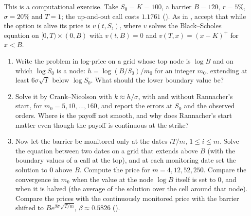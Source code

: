 \begin{exercise}\label{ex:num-barrier}
\medium This is a computational exercise. Take $S_0=K=100$, a barrier $B=120$, $r=5\%$, $\sigma=20\%$ and
$T=1$; the up-and-out call costs $1.1761$ (). As in
, accept that while the option is alive its price is $v(t,S_t)$,
where $v$ solves the Black--Scholes equation on $[0,T)\times(0,B)$ with $v(t,B)=0$ and
$v(T,x)=(x-K)^+$ for $x<B$.
\begin{enumerate}[label=(\alph*)]
  \item Write the problem in log-price on a grid whose top node is $\log B$ and on which $\log S_0$ is a
    node: $h=\log(B/S_0)/m_0$ for an integer $m_0$, extending at least $6\sigma\sqrt T$ below $\log S_0$.
    What should the lower boundary value be?
  \item Solve it by Crank--Nicolson with $k\approx h/\sigma$, with and without Rannacher's start, for
    $m_0=5,10,\dots,160$, and report the errors at $S_0$ and the observed orders. Where is the payoff
    not smooth, and why does Rannacher's start matter even though the payoff is continuous at the
    strike?
  \item Now let the barrier be monitored only at the dates $iT/m$, $1\le i\le m$. Solve the equation
    between two dates on a grid that extends above $B$ (with the boundary values of a call at the top),
    and at each monitoring date set the solution to $0$ above $B$. Compute the price for $m=4,12,52,250$.
    Compare the convergence in $m_0$ when the value at the node $\log B$ itself is set to $0$, and when
    it is halved (the average of the solution over the cell around that node). Compare the prices with
    the continuously monitored price with the barrier shifted to $Be^{\beta\sigma\sqrt{T/m}}$,
    $\beta\approx0.5826$ ().
\end{enumerate}
\end{exercise}

